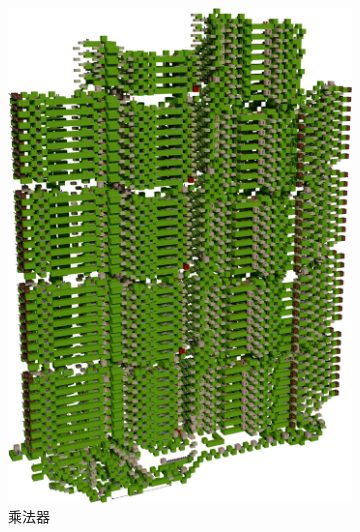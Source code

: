 \documentclass[UTF8,12pt,punct=kaiming,fontset=none]{article}
\begin{document}
    \begin{figure}[H]
	    \centering
        \begin{subfigure}{3in}
		    \label{fig7:a} %
		    \includegraphics[width=\linewidth]{R4PTS.png}
            \caption{乘法器}
        \end{subfigure}
	    \hspace{1in}%
        \begin{subfigure}{1.5in}
		    \label{fig7:subfig:b} %

\end{subfigure}
\end{figure}
\end{document}
